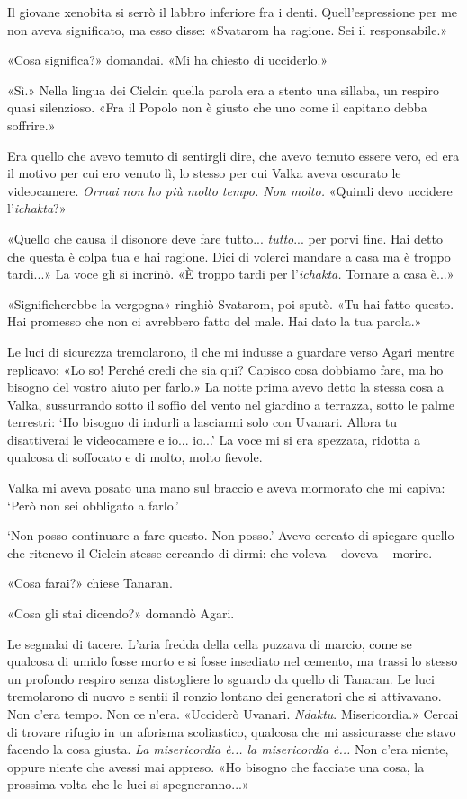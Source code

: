 Il giovane xenobita si serrò il labbro inferiore fra i denti.
Quell'espressione per me non aveva significato, ma esso disse: «Svatarom
ha ragione. Sei il responsabile.»

«Cosa significa?» domandai. «Mi ha chiesto di ucciderlo.»

«Sì.» Nella lingua dei Cielcin quella parola era a stento una {sillaba},
un respiro quasi silenzioso. «Fra il Popolo non è giusto che uno come il
capitano debba soffrire.»

Era quello che avevo temuto di sentirgli dire, che avevo temuto essere
vero, ed era il motivo per cui ero venuto lì, lo stesso per cui Valka
aveva oscurato le videocamere. \emph{Ormai non ho più molto tempo. Non
	molto.} «Quindi devo uccidere l'\emph{ichakta}?»

«Quello che causa il disonore deve fare tutto... \emph{tutto}... per
porvi fine. Hai detto che questa è colpa tua e hai ragione. Dici di
volerci mandare a casa ma è troppo tardi...» La voce gli si incrinò. «È
troppo tardi per l'\emph{ichakta.} Tornare a casa è...»

«Significherebbe la vergogna» ringhiò Svatarom, poi sputò. «Tu hai fatto
questo. Hai promesso che non ci avrebbero fatto del male. Hai dato la
tua parola.»

Le luci di sicurezza tremolarono, il che mi indusse a guardare verso
Agari mentre replicavo: «Lo so! Perché credi che sia qui? Capisco cosa
dobbiamo fare, ma ho bisogno del vostro aiuto per farlo.» La notte prima
avevo detto la stessa cosa a Valka, sussurrando sotto il soffio del
vento nel giardino a terrazza, sotto le palme terrestri: `Ho bisogno di
indurli a lasciarmi solo con Uvanari. Allora tu disattiverai le
videocamere e io... io...' La voce mi si era spezzata, ridotta a
qualcosa di soffocato e di molto, molto fievole.

Valka mi aveva posato una mano sul braccio e aveva mormorato che mi
capiva: `Però non sei obbligato a farlo.'

`Non posso continuare a fare questo. Non posso.' Avevo cercato di
spiegare quello che ritenevo il Cielcin stesse cercando di dirmi: che
voleva -- doveva -- morire.

«Cosa farai?» chiese Tanaran.

«Cosa gli stai dicendo?» domandò Agari.

Le segnalai di tacere. L'aria fredda della cella puzzava di marcio, come
se qualcosa di umido fosse morto e si fosse insediato nel cemento, ma
trassi lo stesso un profondo respiro senza distogliere lo sguardo da
quello di Tanaran. Le luci tremolarono di nuovo e sentii il ronzio
lontano dei generatori che si attivavano. Non c'era tempo. Non ce n'era.
«Ucciderò Uvanari. \emph{Ndaktu}. Misericordia.» Cercai di trovare
rifugio in un aforisma scoliastico, qualcosa che mi assicurasse che
stavo facendo la cosa giusta. \emph{La misericordia è... la misericordia
	è...} Non c'era niente, oppure niente che avessi mai appreso. «Ho
bisogno che facciate una cosa, la prossima volta che le luci si
spegneranno...»

